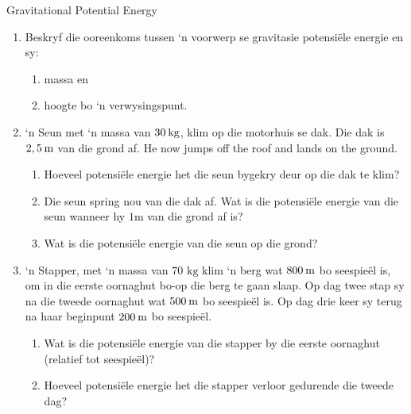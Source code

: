 \begin{exercises}{Gravitational Potential Energy }
            \nopagebreak
      \label{m38784*id66588}\begin{enumerate}[noitemsep, label=\textbf{\arabic*}. ] 
            \label{m38784*uid50}\item Beskryf die ooreenkoms tussen ‘n voorwerp se gravitasie potensi\"{e}le energie en sy:
\label{m38784*id66604}\begin{enumerate}[noitemsep, label=\textbf{\alph*}. ] 
            \label{m38784*uid51}\item massa en 
\label{m38784*uid52}\item hoogte bo ‘n verwysingspunt.
\end{enumerate}
                \label{m38784*uid53}\item ‘n Seun met ‘n massa van $30\phantom{\rule{2pt}{0ex}}\text{kg}$, klim op die motorhuis se dak. Die dak is $2,5\phantom{\rule{2pt}{0ex}}\text{m}$ van die grond af. He now jumps off the roof and lands on the ground.
\label{m38784*id66646}\begin{enumerate}[noitemsep, label=\textbf{\alph*}. ] 
            \label{m38784*uid54}\item Hoeveel potensi\"{e}le energie het die seun bygekry deur op die dak te klim?
\label{m38784*uid55}\item Die seun spring nou van die dak af. Wat is die potensi\"{e}le energie van die seun wanneer hy $1 \text{m}$ van die grond af is?
\label{m38784*uid56}\item Wat is die potensi\"{e}le energie van die seun op die grond?
\end{enumerate}
                \label{m38784*uid57}\item ‘n Stapper, met ‘n massa van $70 \text{ kg}$ klim ‘n berg wat $800\phantom{\rule{2pt}{0ex}}\text{m}$ bo seespie\"{e}l is, om in die eerste oornaghut bo-op die berg te gaan slaap. Op dag twee stap sy na die tweede oornaghut wat $500\phantom{\rule{2pt}{0ex}}\text{m}$ bo seespie\"{e}l is. Op dag drie keer sy terug na haar beginpunt $200\phantom{\rule{2pt}{0ex}}\text{m}$ bo seespie\"{e}l.
\label{m38784*id66702}\begin{enumerate}[noitemsep, label=\textbf{\alph*}. ] 
            \label{m38784*uid58}\item Wat is die potensi\"{e}le energie van die stapper by die eerste oornaghut (relatief tot seespie\"{e}l)?
\label{m38784*uid59}\item Hoeveel potensi\"{e}le energie het die stapper verloor gedurende die tweede dag?

\end{enumerate}
\end{enumerate}
\end{exercises}
